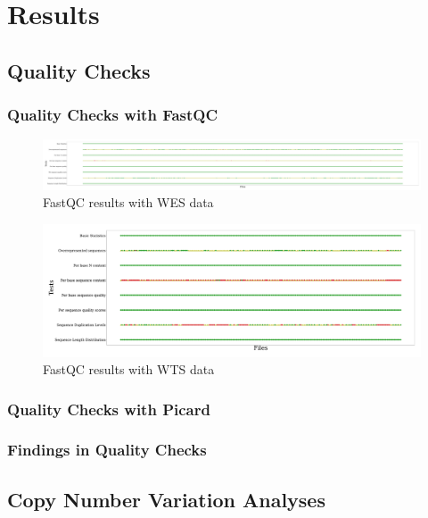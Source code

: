 \documentclass[11pt,a4paper,onecolumn,oneside]{report}
\begin{document}
    \section{Results}
        \subsection{Quality Checks}
            \subsubsection{Quality Checks with FastQC}
                \begin{figure}[p]
                    \centering
                    \includegraphics[width=0.8 \linewidth]{figures/FastQC/FastQC_WES.pdf}
                    \caption{FastQC results with WES data}
                    \label{fig:fastqc-WES}
                \end{figure}

                \begin{figure}[p]
                    \centering
                    \includegraphics[width=0.8 \linewidth]{figures/FastQC/FastQC_WTS.pdf}
                    \caption{FastQC results with WTS data}
                    \label{fig:fastqc-WTS}
                \end{figure}

            \subsubsection{Quality Checks with Picard}

            \subsubsection{Findings in Quality Checks}

        \subsection{Copy Number Variation Analyses}
\end{document}

